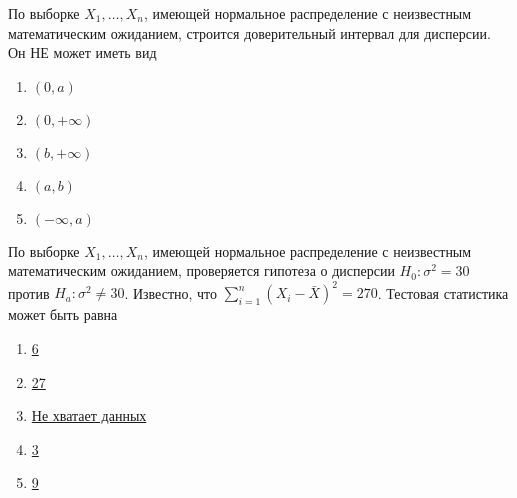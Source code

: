 \documentclass[t]{beamer}
\begin{document}
 \begin{frame} \label{40} 
\begin{block}{40} 

По выборке $X_1,\ldots,X_{n}$, имеющей нормальное распределение с неизвестным математическим ожиданием, строится доверительный интервал для дисперсии. Он НЕ может иметь вид


 \end{block} 
\begin{enumerate} 
\item[] \hyperlink{40-No}{\beamergotobutton{} $(0, a)$}
\item[] \hyperlink{40-No}{\beamergotobutton{} $(0, +\infty)$}
\item[] \hyperlink{40-No}{\beamergotobutton{} $(b, +\infty)$}
\item[] \hyperlink{40-No}{\beamergotobutton{} $(a, b)$}
\item[] \hyperlink{40-Yes}{\beamergotobutton{} $(-\infty, a)$}
\end{enumerate} 
\end{frame} 


 \begin{frame} \label{41} 
\begin{block}{41} 

По выборке $X_1,\ldots,X_{n}$, имеющей нормальное распределение с неизвестным математическим ожиданием, проверяется гипотеза о дисперсии $H_0: \sigma^2 = 30$ против $H_a: \sigma^2 \ne 30$. Известно, что $\sum_{i=1}^{n} (X_i - \bar{X})^2 = 270$. Тестовая статистика может быть равна


 \end{block} 
\begin{enumerate} 
\item[] \hyperlink{41-No}{\beamergotobutton{} 6}
\item[] \hyperlink{41-No}{\beamergotobutton{} 27}
\item[] \hyperlink{41-No}{\beamergotobutton{} Не хватает данных}
\item[] \hyperlink{41-No}{\beamergotobutton{} 3}
\item[] \hyperlink{41-Yes}{\beamergotobutton{} 9}
\end{enumerate} 
\end{frame} 
\end{document}
